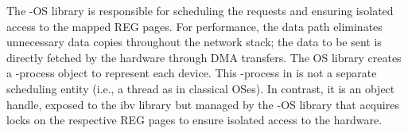  The \projecttitle{}-OS library is responsible for scheduling the requests and ensuring isolated access to the mapped REG pages. 
For performance, the \projecttitle{} data path eliminates unnecessary data copies throughout the network stack; the data to be sent is directly fetched by the hardware through DMA transfers. The OS library creates a \projecttitle{}-process object to represent each \projecttitle{} device. This \projecttitle{}-process in \projecttitle{} is not a separate scheduling entity (i.e., a thread as in classical OSes). 
In contrast, it is an object handle, exposed to the ibv library but managed by the \projecttitle{}-OS library that acquires locks on the respective REG pages to ensure isolated access to the \projecttitle{} hardware.

